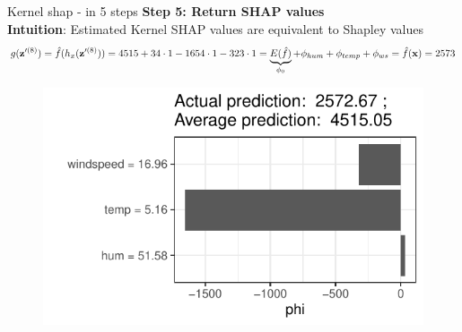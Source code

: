 \documentclass[11pt,compress,t,notes=noshow, aspectratio=169, xcolor=table]{beamer}
\begin{document}
\begin{vbframe}{Kernel shap - in 5 steps}
\textbf{Step 5: Return SHAP values}\\\medskip
\textbf{Intuition}: Estimated Kernel SHAP values are equivalent to Shapley values 
$$
g(\mathbf{z}^{\prime (8)}) = \fh(h_x(\mathbf{z}^{\prime (8)}) ) = 4515 + 34 \cdot 1 - 1654 \cdot 1 - 323 \cdot 1 = \underbrace{E(\fh)}_{\phi_0} + \phi_{hum} + \phi_{temp} + \phi_{ws} = \fh(\xv) = 2573
$$

\begin{figure}
    \centering
    \includegraphics[width=0.5\columnwidth]{figure/shapley2shap.pdf}
\end{figure}






  
\end{vbframe}

\end{document}
